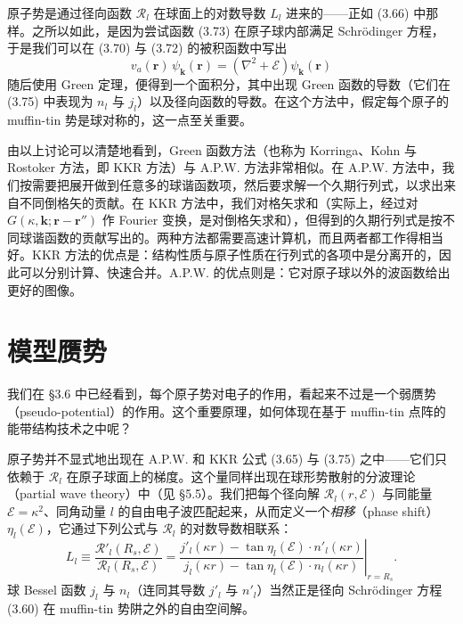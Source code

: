 
原子势是通过径向函数 $\mathcal{R}_l$ 在球面上的对数导数 $L_l$ 进来的——正如 (3.66) 中那样。之所以如此，是因为尝试函数 (3.73) 在原子球内部满足 Schrödinger 方程，于是我们可以在 (3.70) 与 (3.72) 的被积函数中写出
\begin{equation*}
v_a(\mathbf{r})\,\psi_{\mathbf{k}}(\mathbf{r})=\left(\nabla^2+\mathcal{E}\right)\psi_{\mathbf{k}}(\mathbf{r})\tag{3.76}
\end{equation*}
随后使用 Green 定理，便得到一个面积分，其中出现 Green 函数的导数（它们在 (3.75) 中表现为 $n_l$ 与 $j_l$）以及径向函数的导数。在这个方法中，假定每个原子的 muffin-tin 势是球对称的，这一点至关重要。

由以上讨论可以清楚地看到，Green 函数方法（也称为 Korringa、Kohn 与 Rostoker 方法，即 KKR 方法）与 A.P.W. 方法非常相似。在 A.P.W. 方法中，我们按需要把展开做到任意多的球谐函数项，然后要求解一个久期行列式，以求出来自不同倒格矢的贡献。在 KKR 方法中，我们对格矢求和（实际上，经过对 $G(\kappa,\mathbf{k};\mathbf{r}-\mathbf{r}'')$ 作 Fourier 变换，是对倒格矢求和），但得到的久期行列式是按不同球谐函数的贡献写出的。两种方法都需要高速计算机，而且两者都工作得相当好。KKR 方法的优点是：结构性质与原子性质在行列式的各项中是分离开的，因此可以分别计算、快速合并。A.P.W. 的优点则是：它对原子球以外的波函数给出更好的图像。

\section{模型赝势}

我们在 §3.6 中已经看到，每个原子势对电子的作用，看起来不过是一个弱赝势（pseudo-potential）的作用。这个重要原理，如何体现在基于 muffin-tin 点阵的能带结构技术之中呢？

原子势并不显式地出现在 A.P.W. 和 KKR 公式 (3.65) 与 (3.75) 之中——它们只依赖于 $\mathcal{R}_l$ 在原子球面上的梯度。这个量同样出现在球形势散射的分波理论（partial wave theory）中（见 §5.5）。我们把每个径向解 $\mathcal{R}_l(r,\mathcal{E})$ 与同能量 $\mathcal{E}=\kappa^2$、同角动量 $l$ 的自由电子波匹配起来，从而定义一个\emph{相移}（phase shift）$\eta_l(\mathcal{E})$，它通过下列公式与 $\mathcal{R}_l$ 的对数导数相联系：
\begin{equation*}
L_l\equiv\frac{\mathcal{R}'_l(R_s,\mathcal{E})}{\mathcal{R}_l(R_s,\mathcal{E})}=\left.\frac{j'_l(\kappa r)-\tan\eta_l(\mathcal{E})\cdot n'_l(\kappa r)}{j_l(\kappa r)-\tan\eta_l(\mathcal{E})\cdot n_l(\kappa r)}\right|_{r=R_s}.\tag{3.77}
\end{equation*}
球 Bessel 函数 $j_l$ 与 $n_l$（连同其导数 $j'_l$ 与 $n'_l$）当然正是径向 Schrödinger 方程 (3.60) 在 muffin-tin 势阱之外的自由空间解。

